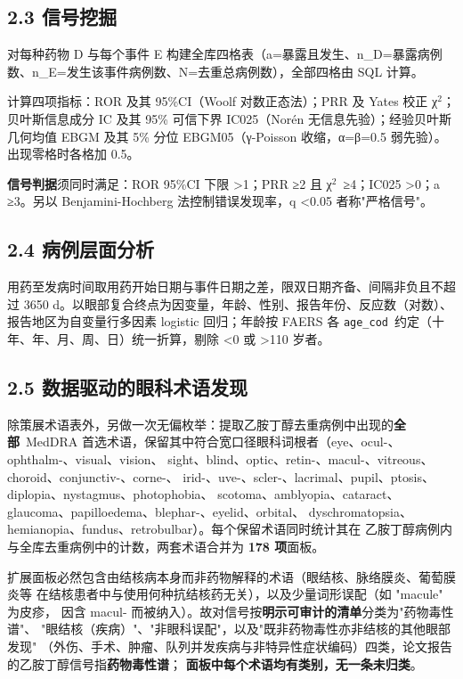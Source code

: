 \documentclass[UTF8,fontset=windows,11pt]{ctexart}
\begin{document}
\subsection{2.3 信号挖掘}

对每种药物 D 与每个事件 E 构建全库四格表（a=暴露且发生、n\_D=暴露病例数、n\_E=发生该事件病例数、N=去重总病例数），全部四格由 SQL 计算。

计算四项指标：ROR 及其 95\%CI（Woolf 对数正态法）；PRR 及 Yates 校正 χ$^{2}$；贝叶斯信息成分 IC 及其 95\% 可信下界 IC025（Norén 无信息先验）；经验贝叶斯几何均值 EBGM 及其 5\% 分位 EBGM05（γ-Poisson 收缩，α=β=0.5 弱先验）。出现零格时各格加 0.5。

\textbf{信号判据}须同时满足：ROR 95\%CI 下限 >1；PRR ≥2 且 χ$^{2}$\ ≥4；IC025 >0；a ≥3。另以 Benjamini-Hochberg 法控制错误发现率，q <0.05 者称"严格信号"。

\subsection{2.4 病例层面分析}

用药至发病时间取用药开始日期与事件日期之差，限双日期齐备、间隔非负且不超过 3650 d。以眼部复合终点为因变量，年龄、性别、报告年份、反应数（对数）、报告地区为自变量行多因素 logistic 回归；年龄按 FAERS 各 \texttt{age\_cod}\ 约定（十年、年、月、周、日）统一折算，剔除 <0 或 >110 岁者。

\subsection{2.5 数据驱动的眼科术语发现}

除策展术语表外，另做一次无偏枚举：提取乙胺丁醇去重病例中出现的\textbf{全部}\ MedDRA 首选术语，保留其中符合宽口径眼科词根者（eye、ocul-、ophthalm-、visual、vision、 sight、blind、optic、retin-、macul-、vitreous、choroid、conjunctiv-、corne-、 irid-、uve-、scler-、lacrimal、pupil、ptosis、diplopia、nystagmus、photophobia、 scotoma、amblyopia、cataract、glaucoma、papilloedema、blephar-、eyelid、orbital、 dyschromatopsia、hemianopia、fundus、retrobulbar）。每个保留术语同时统计其在 乙胺丁醇病例内与全库去重病例中的计数，两套术语合并为 \textbf{178 项}面板。

扩展面板必然包含由结核病本身而非药物解释的术语（眼结核、脉络膜炎、葡萄膜炎等 在结核患者中与使用何种抗结核药无关），以及少量词形误配（如 "macule" 为皮疹， 因含 macul- 而被纳入）。故对信号按\textbf{明示可审计的清单}分类为"药物毒性谱"、 "眼结核（疾病）"、"非眼科误配"，以及"既非药物毒性亦非结核的其他眼部发现" （外伤、手术、肿瘤、队列并发疾病与非特异性症状编码）四类，论文报告的乙胺丁醇信号指\textbf{药物毒性谱}； \textbf{面板中每个术语均有类别，无一条未归类}。
\end{document}
